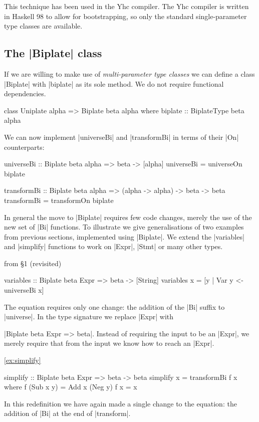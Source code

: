 This technique has been used in the Yhc compiler. The Yhc compiler is written in Haskell 98 to allow for bootstrapping, so only the standard single-parameter type classes are available.

\subsection{The |Biplate| class}

If we are willing to make use of \textit{multi-parameter type classes} \cite{jones:mptc} we can define a class |Biplate| with |biplate| as its sole method. We do not require functional dependencies.

\begin{code}
class  Uniplate alpha => Biplate beta alpha where
       biplate :: BiplateType beta alpha
\end{code}

We can now implement |universeBi| and |transformBi| in terms of their |On| counterparts:

\begin{code}
universeBi :: Biplate beta alpha => beta -> [alpha]
universeBi = universeOn biplate

transformBi :: Biplate beta alpha => (alpha -> alpha) -> beta -> beta
transformBi = transformOn biplate
\end{code}

In general the move to |Biplate| requires few code changes, merely the use of the new set of |Bi| functions. To illustrate we give generalisations of two examples from previous sections, implemented using |Biplate|. We extend the |variables| and |simplify| functions to work on |Expr|, |Stmt| or many other types.

\begin{exampleany}{from \S1 (revisited)}
\begin{code}
variables :: Biplate beta Expr => beta -> [String]
variables x = [y | Var y <- universeBi x]
\end{code}

The equation requires only one change: the addition of the |Bi| suffix to |universe|. In the type signature we replace |Expr| with \ignore|Biplate beta Expr => beta|. Instead of requiring the input to be an |Expr|, we merely require that from the input we know how to reach an |Expr|.
\end{exampleany}

\begin{examplerevisit}{\ref{ex:simplify}}
\begin{code}
simplify :: Biplate beta Expr => beta -> beta
simplify x = transformBi f x
    where  f (Sub x y)  = Add x (Neg y)
           f x          = x
\end{code}

In this redefinition we have again made a single change to the equation: the addition of |Bi| at the end of |transform|.
\end{examplerevisit}

